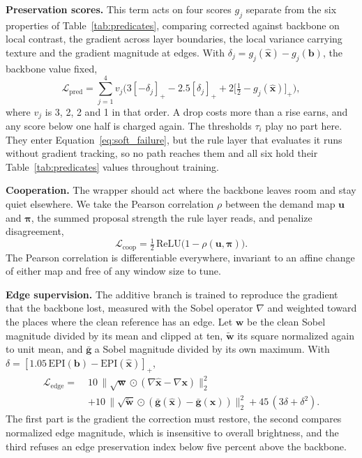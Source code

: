 \textbf{Preservation scores.} This term acts on four scores $g_j$ separate from the six properties of
Table~\ref{tab:predicates}, comparing corrected against backbone on local contrast, the gradient
across layer boundaries, the local variance carrying texture and the gradient magnitude at edges.
With $\delta_j = g_j(\hat{\mathbf{x}}) - g_j(\mathbf{b})$, the backbone value fixed,
\begin{equation}
\mathcal{L}_{\mathrm{pred}} = \sum_{j=1}^{4} v_j \Big( 3[-\delta_j]_+ - 2.5[\delta_j]_+
 + 2\big[\tfrac{1}{2} - g_j(\hat{\mathbf{x}})\big]_+ \Big) ,
\label{eq:loss_pred}
\end{equation}
where $v_j$ is 3, 2, 2 and 1 in that order. A drop costs more than a rise earns, and any score below
one half is charged again. The thresholds $\tau_i$ play no part here. They enter
Equation~\eqref{eq:soft_failure}, but the rule layer that evaluates it runs without gradient
tracking, so no path reaches them and all six hold their Table~\ref{tab:predicates} values
throughout training.

\textbf{Cooperation.} The wrapper should act where the backbone leaves room and stay quiet elsewhere.
We take the Pearson correlation $\rho$ between the demand map $\mathbf{u}$ and $\boldsymbol{\pi}$, the
summed proposal strength the rule layer reads, and penalize disagreement,
\begin{equation}
\mathcal{L}_{\mathrm{coop}} = \tfrac{1}{2}\,\mathrm{ReLU}\big(1 - \rho(\mathbf{u}, \boldsymbol{\pi})\big).
\label{eq:loss_coop}
\end{equation}
The Pearson correlation is differentiable everywhere, invariant to an affine change of either map and
free of any window size to tune.

\textbf{Edge supervision.} The additive branch is trained to reproduce the gradient that the backbone
lost, measured with the Sobel operator $\nabla$ and weighted toward the places where the clean
reference has an edge. Let $\mathbf{w}$ be the clean Sobel magnitude divided by its mean and clipped
at ten, $\tilde{\mathbf{w}}$ its square normalized again to unit mean, and $\bar{\mathbf{g}}$ a Sobel
magnitude divided by its own maximum. With $\delta = [1.05\,\mathrm{EPI}(\mathbf{b}) -
\mathrm{EPI}(\hat{\mathbf{x}})]_+$,
\begin{equation}
\begin{split}
\mathcal{L}_{\mathrm{edge}} = \;&10\,\big\lVert \sqrt{\mathbf{w}} \odot
  (\nabla\hat{\mathbf{x}} - \nabla\mathbf{x}) \big\rVert_2^2 \\
 &+ 10\,\big\lVert \sqrt{\tilde{\mathbf{w}}} \odot
  (\bar{\mathbf{g}}(\hat{\mathbf{x}}) - \bar{\mathbf{g}}(\mathbf{x})) \big\rVert_2^2
 + 45\,(3\delta + \delta^2).
\end{split}
\label{eq:loss_edge}
\end{equation}
The first part is the gradient the correction must restore, the second compares normalized edge
magnitude, which is insensitive to overall brightness, and the third refuses an edge preservation
index below five percent above the backbone.

